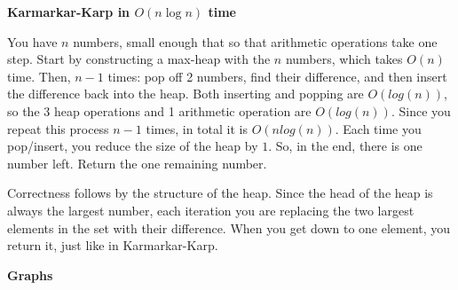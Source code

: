 \documentclass[12pt]{article}
\begin{document}
\noindent 
\bigskip

\noindent \textbf{Karmarkar-Karp in $O(n\log n)$ time}
\medskip

\noindent You have $n$ numbers, small enough that so that arithmetic operations take one step. Start by constructing a max-heap with the $n$ numbers, which takes $O(n)$ time. Then, $n-1$ times: pop off 2 numbers, find their difference, and then insert the difference back into the heap. Both inserting and popping are $O(log(n))$, so the 3 heap operations and 1 arithmetic operation are $O(log(n))$. Since you repeat this process $n-1$ times, in total it is $O(nlog(n))$. Each time you pop/insert, you reduce the size of the heap by $1$. So, in the end, there is one number left. Return the one remaining number.

Correctness follows by the structure of the heap. Since the head of the heap is always the largest number, each iteration you are replacing the two largest elements in the set with their difference. When you get down to one element, you return it, just like in Karmarkar-Karp.

\bigskip

\begin{center} \textbf{Graphs} \end{center}
\end{document}
